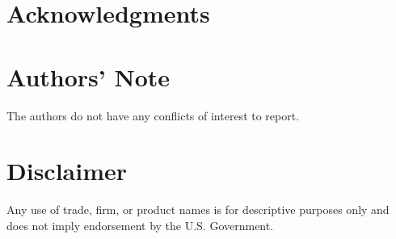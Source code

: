 \documentclass[preprint,authoryear,11pt]{elsarticle}
\begin{document}
%
%
%

\section*{Acknowledgments}


\section*{Authors' Note}

The authors do not have any conflicts of interest to report.

\section*{Disclaimer}

Any use of trade, firm, or product names is for descriptive purposes only and does not imply endorsement by the U.S. Government.



\end{document}

